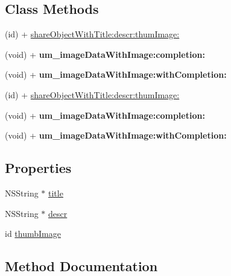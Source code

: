 \subsection*{Class Methods}
\begin{DoxyCompactItemize}
\item 
(id) + \mbox{\hyperlink{interface_u_m_share_object_a58413a71694ebb3de6a8b0f4f9a800a5}{share\+Object\+With\+Title\+:descr\+:thum\+Image\+:}}
\item 
\mbox{\label{interface_u_m_share_object_add9769b9676cac5d4fec056498ab76a6}} 
(void) + {\bfseries um\+\_\+image\+Data\+With\+Image\+:completion\+:}
\item 
\mbox{\label{interface_u_m_share_object_a2ec042d96d410db554edd0e52adb1ad0}} 
(void) + {\bfseries um\+\_\+image\+Data\+With\+Image\+:with\+Completion\+:}
\item 
(id) + \mbox{\hyperlink{interface_u_m_share_object_a58413a71694ebb3de6a8b0f4f9a800a5}{share\+Object\+With\+Title\+:descr\+:thum\+Image\+:}}
\item 
\mbox{\label{interface_u_m_share_object_add9769b9676cac5d4fec056498ab76a6}} 
(void) + {\bfseries um\+\_\+image\+Data\+With\+Image\+:completion\+:}
\item 
\mbox{\label{interface_u_m_share_object_a2ec042d96d410db554edd0e52adb1ad0}} 
(void) + {\bfseries um\+\_\+image\+Data\+With\+Image\+:with\+Completion\+:}
\end{DoxyCompactItemize}
\subsection*{Properties}
\begin{DoxyCompactItemize}
\item 
N\+S\+String $\ast$ \mbox{\hyperlink{interface_u_m_share_object_abe55135b8e383e429b961b04a1b459c0}{title}}
\item 
N\+S\+String $\ast$ \mbox{\hyperlink{interface_u_m_share_object_afe340b4a1e950e794c64400e2bd17535}{descr}}
\item 
id \mbox{\hyperlink{interface_u_m_share_object_ac8c60ad664ac874bec56acd3304876fe}{thumb\+Image}}
\end{DoxyCompactItemize}


\subsection{Method Documentation}
\mbox{\label{interface_u_m_share_object_a58413a71694ebb3de6a8b0f4f9a800a5}} 
